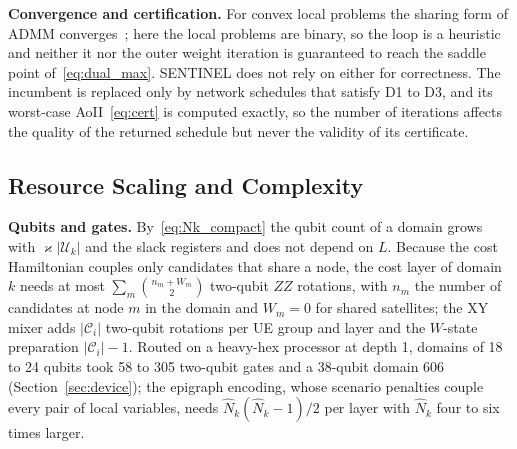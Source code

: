 \textbf{Convergence and certification.} For convex local problems the sharing form of ADMM converges~\cite{Boyd2011};
here the local problems are binary, so the loop is a heuristic and neither it nor the outer weight iteration is
guaranteed to reach the saddle point of~\eqref{eq:dual_max}. SENTINEL does not rely on either for correctness. The
incumbent is replaced only by network schedules that satisfy D1 to D3, and its worst-case AoII~\eqref{eq:cert} is
computed exactly, so the number of iterations affects the quality of the returned schedule but never the validity of
its certificate.

\subsection{Resource Scaling and Complexity}
\label{sec:complexity}

\textbf{Qubits and gates.} By~\eqref{eq:Nk_compact} the qubit count of a domain grows with
$\varkappa|\mathscr{U}_k|$ and the slack registers and does not depend on $L$. Because the cost Hamiltonian couples
only candidates that share a node, the cost layer of domain $k$ needs at most $\sum_{m}\binom{n_{m}+W_m}{2}$ two-qubit
$ZZ$ rotations, with $n_m$ the number of candidates at node $m$ in the domain and $W_m=0$ for shared satellites; the
XY mixer adds $|\mathscr{C}_i|$ two-qubit rotations per UE group and layer and the $W$-state preparation
$|\mathscr{C}_i|-1$. Routed on a heavy-hex processor at depth 1, domains of 18 to 24 qubits took 58 to 305 two-qubit
gates and a 38-qubit domain 606 (Section~\ref{sec:device}); the epigraph encoding, whose scenario penalties couple
every pair of local variables, needs $\hat N_k(\hat N_k-1)/2$ per layer with $\hat N_k$ four to six times larger.

